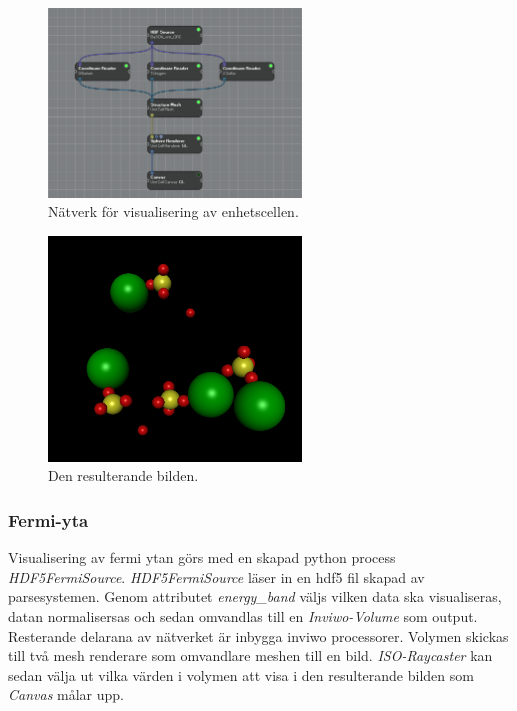 \documentclass[10pt,oneside,swedish]{article}
\begin{document}
\begin{figure}[H]
\centering
\includegraphics[width=0.60000\textwidth]{Images/unitcell_network.png}
\caption{Nätverk för visualisering av enhetscellen.}
\end{figure}

\begin{figure}[H]
\centering
\includegraphics[width=0.60000\textwidth]{Images/unitcell.png}
\caption{Den resulterande bilden.}
\end{figure}

\subsubsection{Fermi-yta}\label{fermi-yta}

Visualisering av fermi ytan görs med en skapad python process
\emph{HDF5FermiSource}. \emph{HDF5FermiSource} läser in en hdf5 fil
skapad av parsesystemen. Genom attributet \emph{energy\_band} väljs
vilken data ska visualiseras, datan normalisersas och sedan omvandlas
till en \emph{Inviwo-Volume} som output. Resterande delarana av
nätverket är inbygga inviwo processorer. Volymen skickas till två mesh
renderare som omvandlare meshen till en bild. \emph{ISO-Raycaster} kan
sedan välja ut vilka värden i volymen att visa i den resulterande bilden
som \emph{Canvas} målar upp.
\end{document}
